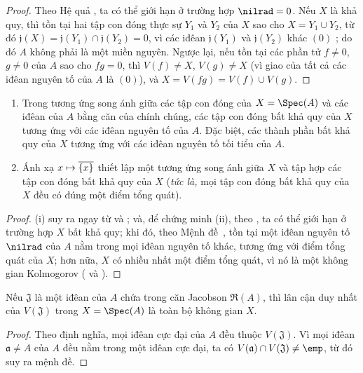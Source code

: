 \documentclass[oneside]{amsart}
\makeatletter
\newcommand{\ega@arrow}[2]{\mathchoice{#1}{#2}{#2}{#2}}
\let\ega@shortmapsto\mapsto
\renewcommand{\mapsto}{\ega@arrow{\longmapsto}{\ega@shortmapsto}}
\newcommand{\oldpage}[2][]{{\marginnote{\normalfont\textbf{#1}~|~#2}}\ignorespaces}
\let\EGAOriginalLabel\label
\renewcommand{\label}[1]{\phantomsection\EGAOriginalLabel{#1}}
\makeatother
\begin{document}
\begin{proof}
Theo Hệ quả , ta có thể giới hạn ở trường hợp $\nilrad=0$.
Nếu $X$ là khả quy, thì tồn tại hai tập con đóng thực sự $Y_1$ và $Y_2$ của $X$ sao cho $X=Y_1\cup Y_2$, từ đó $\mathfrak{j}(X)=\mathfrak{j}(Y_1)\cap\mathfrak{j}(Y_2)=0$, vì các iđêan $\mathfrak{j}(Y_1)$ và $\mathfrak{j}(Y_2)$ khác $(0)$ ;
do đó $A$ không phải là một miền nguyên.
Ngược lại, nếu tồn tại các phần tử $f\neq 0$, $g\neq 0$ của $A$ sao cho $fg=0$, thì $V(f)\neq X$, $V(g)\neq X$ (vì giao của tất cả các iđêan nguyên tố của $A$ là $(0)$), và $X=V(fg)=V(f)\cup V(g)$.
\end{proof}

\begin{corollary}[1.1.14]
\label{I.1.1.14}
\medskip\noindent
\begin{enumerate}
  \item[{\rm(i)}] Trong tương ứng song ánh giữa các tập con đóng của $X=\Spec(A)$ và các iđêan của $A$ bằng căn của chính chúng, các tập con đóng bất khả quy của $X$ tương ứng với các iđêan nguyên tố của $A$.
    Đặc biệt, các thành phần bất khả quy của $X$ tương ứng với các iđêan nguyên tố tối tiểu của $A$.
  \item[{\rm(ii)}] Ánh xạ $x\mapsto\overline{\{x\}}$ thiết lập một tương ứng song ánh giữa $X$ và tập hợp các tập con đóng bất khả quy của $X$ (\emph{tức là,} mọi tập con đóng bất khả quy của $X$ đều có đúng một điểm tổng quát).
\end{enumerate}
\end{corollary}

\begin{proof}
(i) suy ra ngay từ  và ;
và, để chứng minh (ii), theo , ta có thể giới hạn ở trường hợp $X$ bất khả quy;
khi đó, theo Mệnh đề~, tồn tại một iđêan nguyên tố $\nilrad$ của $A$ nằm trong mọi iđêan nguyên tố khác, tương ứng với điểm tổng quát
\oldpage[I]{83}
của $X$;
hơn nữa, $X$ có nhiều nhất một điểm tổng quát, vì nó là một không gian Kolmogorov ( và ).
\end{proof}

\begin{proposition}[1.1.15]
\label{I.1.1.15}
Nếu $\mathfrak{J}$ là một iđêan của $A$ chứa trong căn Jacobson $\mathfrak{R}(A)$, thì lân cận duy nhất của $V(\mathfrak{J})$ trong $X=\Spec(A)$ là toàn bộ không gian $X$.
\end{proposition}

\begin{proof}
Theo định nghĩa, mọi iđêan cực đại của $A$ đều thuộc $V(\mathfrak{J})$.
Vì mọi iđêan $\mathfrak{a}\neq A$ của $A$ đều nằm trong một iđêan cực đại, ta có $V(\mathfrak{a})\cap V(\mathfrak{J})\neq\emp$, từ đó suy ra mệnh đề.
\end{proof}
\end{document}
